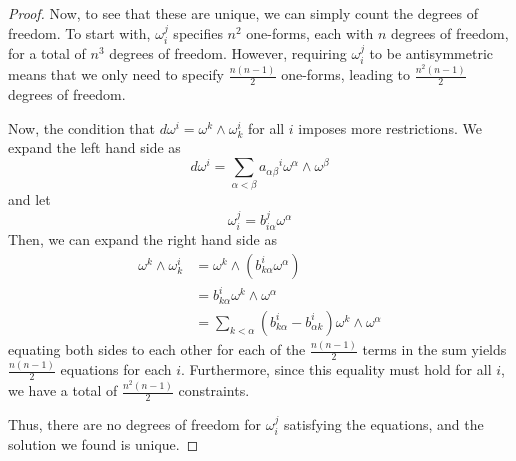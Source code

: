 \documentclass[fontsize=11pt]{scrartcl} %
\numberwithin{equation}{section} %
\numberwithin{figure}{section} %
\numberwithin{table}{section} %
\begin{document}
\begin{proof}
    Now, to see that these are unique, we can simply count the degrees of
    freedom. To start with, $\omega_i^j$ specifies $n^2$ one-forms, each with
    $n$ degrees of freedom, for a total of $n^3$ degrees of freedom. However,
    requiring $\omega_i^j$ to be antisymmetric means that we only need to
    specify $\frac{n(n-1)}{2}$ one-forms, leading to $\frac{n^2(n-1)}{2}$
    degrees of freedom.

    Now, the condition that $d\omega^i = \omega^k\wedge\omega_k^i$ for all $i$
    imposes more restrictions. We expand the left hand side as
    \[
        d\omega^i =
        \sum_{\alpha<\beta}a_{\alpha\beta}{}^i\omega^{\alpha}\wedge\omega^{\beta}
    \]
    and let 
    \[
        \omega^j_i = b_{i\alpha}^j\omega^{\alpha}
    \]
    Then, we can expand the right hand side as
    \[
\begin{aligned}
    \omega^k\wedge\omega^i_k &= \omega^k\wedge(b^i_{k\alpha}\omega^{\alpha})\\
    &= b^i_{k\alpha}\omega^k\wedge\omega^{\alpha}\\
    &=\sum_{k<\alpha}(b^i_{k\alpha}-b^i_{\alpha k})\omega^k\wedge\omega^{\alpha}
\end{aligned}
    \]
    equating both sides to each other for each of the $\frac{n(n-1)}{2}$ terms
    in the sum yields $\frac{n(n-1)}{2}$ equations for each $i$. Furthermore,
    since this equality must hold for all $i$, we have a total of
    $\frac{n^2(n-1)}{2}$ constraints.

    Thus, there are no degrees of freedom for $\omega^j_i$ satisfying the
    equations, and the solution we found is unique.
\end{proof}

\newpage
\end{document}
